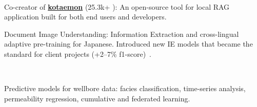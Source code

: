 \\
\vspace{-.2em}
\begin{zitemize}
    \item Co-creator of \href{https://github.com/Cinnamon/kotaemon}{\textbf{kotaemon}}
    (25.3k+ {\scriptsize \faStar}): An open-source tool for local RAG application built for both end users and developers.
    \item Document Image Understanding: Information Extraction and cross-lingual adaptive pre-training
    for Japanese. Introduced new IE models that became the standard for client projects (+2--7\%
    f1-score)~\cite{nguyen2021span,son2022jointly}.
\end{zitemize}

\\
\vspace{-.2em}
\begin{zitemize}
    \item Predictive models for wellbore data: facies classification, time-series analysis,
    permeability regression, cumulative and federated learning.
\end{zitemize}
